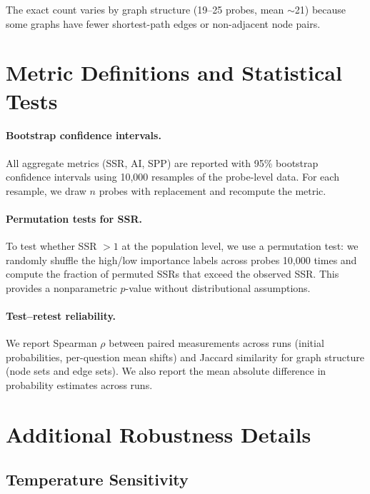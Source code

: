 \documentclass[11pt]{article}
\begin{document}
The exact count varies by graph structure (19--25 probes, mean ${\sim}$21) because some graphs have fewer shortest-path edges or non-adjacent node pairs.

\section{Metric Definitions and Statistical Tests}
\label{app:metrics}

\paragraph{Bootstrap confidence intervals.} All aggregate metrics (SSR, AI, SPP) are reported with 95\% bootstrap confidence intervals using 10,000 resamples of the probe-level data. For each resample, we draw $n$ probes with replacement and recompute the metric.

\paragraph{Permutation tests for SSR.} To test whether SSR $> 1$ at the population level, we use a permutation test: we randomly shuffle the high/low importance labels across probes 10,000 times and compute the fraction of permuted SSRs that exceed the observed SSR. This provides a nonparametric $p$-value without distributional assumptions.

\paragraph{Test--retest reliability.} We report Spearman $\rho$ between paired measurements across runs (initial probabilities, per-question mean shifts) and Jaccard similarity for graph structure (node sets and edge sets). We also report the mean absolute difference in probability estimates across runs.

\section{Additional Robustness Details}
\label{app:robustness}

\subsection{Temperature Sensitivity}
\end{document}

